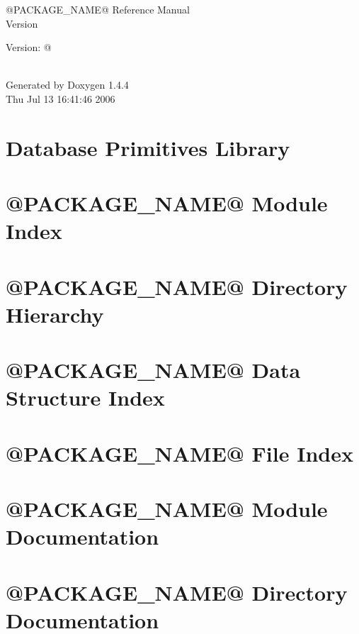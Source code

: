 \documentclass[letterpaper]{book}
\begin{document}
\begin{titlepage}
\vspace*{7cm}
\begin{center}
{\Large @PACKAGE\_\-NAME@ Reference Manual\\[1ex]\large Version \begin{Desc}
\item[Version:]@ \end{Desc}
}\\
\vspace*{1cm}
{\large Generated by Doxygen 1.4.4}\\
\vspace*{0.5cm}
{\small Thu Jul 13 16:41:46 2006}\\
\end{center}
\end{titlepage}
\clearemptydoublepage
{}
\tableofcontents
\clearemptydoublepage
{}
\chapter{Database Primitives Library }
\label{index}\hypertarget{index}{}
\chapter{@PACKAGE\_\-NAME@ Module Index}

\chapter{@PACKAGE\_\-NAME@ Directory Hierarchy}

\chapter{@PACKAGE\_\-NAME@ Data Structure Index}

\chapter{@PACKAGE\_\-NAME@ File Index}

\chapter{@PACKAGE\_\-NAME@ Module Documentation}





\chapter{@PACKAGE\_\-NAME@ Directory Documentation}

\end{document}

